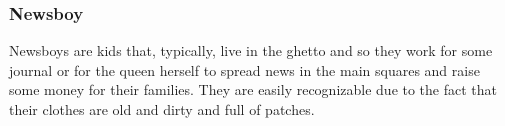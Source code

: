 \subsubsection*{Newsboy}
Newsboys are kids that, typically, live in the ghetto and so they work for some journal or for the queen herself to spread news in the main squares and raise some money for their families. They are easily recognizable due to the fact that their clothes are old and dirty and full of patches.
